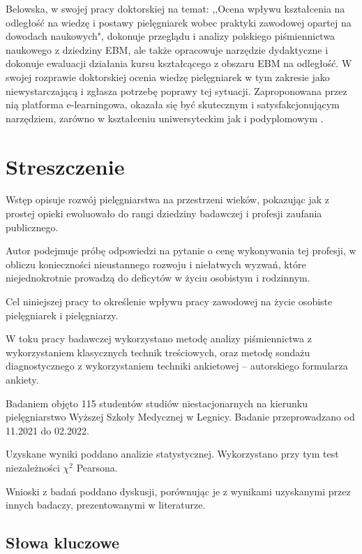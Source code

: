 \documentclass[a4paper,12pt,twoside,openright]{mwrep}
\begin{document}
Belowska, w swojej pracy doktorskiej na temat: ,,Ocena wpływu kształcenia na odległość na wiedzę i postawy pielęgniarek wobec praktyki zawodowej opartej na dowodach naukowych", dokonuje przeglądu i analizy polskiego piśmiennictwa naukowego z dziedziny EBM, ale także opracowuje narzędzie dydaktyczne i dokonuje ewaluacji działania kursu kształcącego z obszaru EBM na odległość. W swojej rozprawie doktorskiej ocenia wiedzę pielęgniarek w tym zakresie jako niewystarczającą i zgłasza potrzebę poprawy tej sytuacji. Zaproponowana przez nią platforma e-learningowa, okazała się być skutecznym i satysfakcjonującym narzędziem, zarówno w kształceniu uniwersyteckim jak i podyplomowym \cite{belowska}.



\chapter*{Streszczenie}


Wstęp opisuje rozwój pielęgniarstwa na przestrzeni wieków, pokazując jak z prostej opieki ewoluowało do rangi dziedziny badawczej i profesji zaufania publicznego. 

Autor podejmuje próbę odpowiedzi na pytanie o cenę wykonywania tej profesji, w obliczu konieczności nieustannego rozwoju i niełatwych wyzwań, które niejednokrotnie prowadzą do deficytów w życiu osobistym i rodzinnym. 

Cel niniejszej pracy to określenie wpływu pracy zawodowej na życie osobiste pielęgniarek i pielęgniarzy.

W toku pracy badawczej wykorzystano metodę analizy piśmiennictwa z wykorzystaniem klasycznych technik treściowych, oraz metodę sondażu diagnostycznego z wykorzystaniem techniki ankietowej – autorskiego formularza ankiety. 

Badaniem objęto 115 studentów studiów niestacjonarnych na kierunku pielęgniarstwo Wyższej Szkoły Medycznej w Legnicy. Badanie przeprowadzano od 11.2021 do 02.2022.

Uzyskane wyniki poddano analizie statystycznej. Wykorzystano przy tym test niezależności $\chi^2$ Pearsona.

Wnioski z badań poddano dyskusji, porównując je z wynikami uzyskanymi przez innych badaczy, prezentowanymi w literaturze.

\vspace{\baselineskip} 

\section*{Słowa kluczowe}
\end{document}
